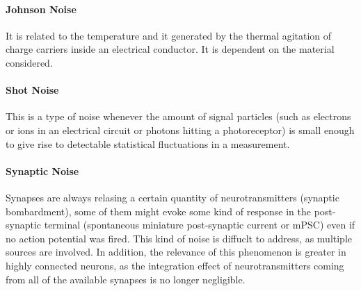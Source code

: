 \paragraph{Johnson Noise} It is related to the temperature and it generated by the thermal agitation of charge
carriers inside an electrical conductor. It is dependent on the material considered.
\paragraph{Shot Noise} This is a type of noise whenever the amount of signal particles (such as electrons or ions
in an electrical circuit or photons hitting a photoreceptor) is small enough to give rise to detectable
statistical fluctuations in a measurement.
\paragraph{Synaptic Noise} Synapses are always relasing a certain quantity of neurotransmitters
(synaptic bombardment), some of them might evoke some kind of response in the post-synaptic terminal
(spontaneous miniature post-synaptic current or mPSC) even if no
action potential was fired. This kind of noise is diffuclt to address, as multiple sources are involved.
In addition, the relevance of this phenomenon is greater in highly connected neurons, as the integration
effect of neurotransmitters coming from all of the available synapses is no longer negligible.

